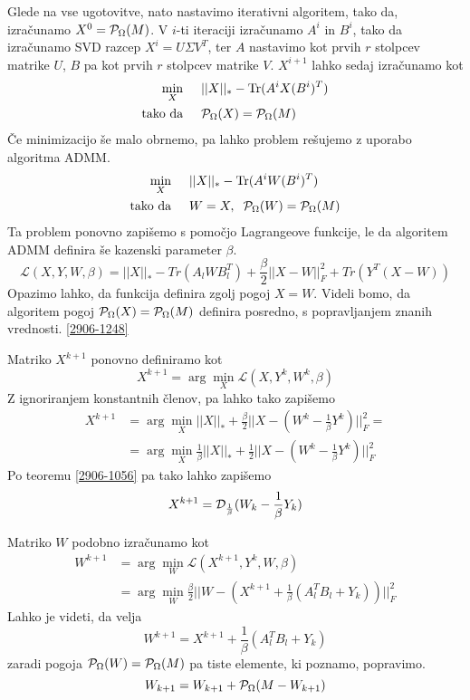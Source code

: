 Glede na vse ugotovitve, nato nastavimo iterativni algoritem, tako da, izračunamo $X^0 = \mathcal{P}_\Omega(M)$. V $i$-ti iteraciji izračunamo $A^i$ in $B^i$, tako da izračunamo SVD razcep $X^i = U \Sigma V^T$, ter $A$ nastavimo kot prvih $r$ stolpcev matrike $U$, $B$ pa kot prvih $r$ stolpcev matrike $V$. $X^{i+1}$ lahko sedaj izračunamo kot \cite{TNNM-HZYLH12}
\begin{align*}
    \min_X \hspace{0.5cm} &||X||_* - \text{Tr}(A^iX(B^i)^T)\\
    \text{tako da} \hspace{0.5cm} &\mathcal{P}_\Omega(X) = \mathcal{P}_\Omega(M)
\end{align*}
Če minimizacijo še malo obrnemo, pa lahko problem rešujemo z uporabo algoritma ADMM.  
\begin{align*}
    \min_X \hspace{0.5cm} &||X||_* - \text{Tr}(A^iW(B^i)^T)\\
    \text{tako da} \hspace{0.5cm} &W=X, \hspace{0.2cm} \mathcal{P}_\Omega(W) = \mathcal{P}_\Omega(M)
\end{align*}
Ta problem ponovno zapišemo s pomočjo Lagrangeove funkcije, le da algoritem ADMM definira še kazenski parameter $\beta$. \cite{TNNM-HZYLH12} 
\[ 
\mathcal{L}(X, Y, W, \beta) = ||X||_* - Tr(A_l W B_l^T) + \frac{\beta}{2} ||X - W||_F^2 + Tr(Y^T(X-W))
\]
Opazimo lahko, da funkcija definira zgolj pogoj $X = W$. Videli bomo, da algoritem pogoj $\mathcal{P}_\Omega(X) = \mathcal{P}_\Omega(M)$ definira posredno, s popravljanjem znanih vrednosti. \ref{2906-1248}

Matriko $X^{k+1}$ ponovno definiramo kot 
\[
  X^{k+1} = \arg \min_X \mathcal{L}(X, Y^k, W^k, \beta)  
\]
Z ignoriranjem konstantnih členov, pa lahko tako zapišemo 
\begin{align*}
  X^{k+1} &= \arg \min_X ||X||_* + \frac{\beta}{2} ||X-(W^k - \frac{1}{\beta}Y^k)||^2_F = \\
  &= \arg \min_X \frac{1}{\beta}||X||_* +  \frac{1}{2}||X-(W^k - \frac{1}{\beta}Y^k)||^2_F
\end{align*}
Po teoremu \ref{2906-1056} pa tako lahko zapišemo 
\[
    X^{k+1} = \mathcal{D}_\frac{1}{\beta}(W_k - \frac{1}{\beta} Y_k)
\]

Matriko $W$ podobno izračunamo kot 
\begin{align*}
    W^{k+1} &= \arg \min_{W} \mathcal{L}(X^{k+1}, Y^k, W, \beta) \\ 
    &= \arg \min_W \frac{\beta}{2} ||W - (X^{k+1} + \frac{1}{\beta}(A_l^T B_l + Y_k)) ||^2_F
\end{align*}
Lahko je videti, da velja
\[
    W^{k+1} = X^{k+1} + \frac{1}{\beta}(A_l^T B_l + Y_k)
\]
zaradi pogoja $\mathcal{P}_\Omega(W) = \mathcal{P}_\Omega(M)$ pa tiste elemente, ki poznamo, popravimo. \cite{TNNM-HZYLH12}
\begin{equation}
    \label{2906-1248}
    W_{k+1} = W_{k+1} + \mathcal{P}_\Omega(M - W_{k+1})
\end{equation}

